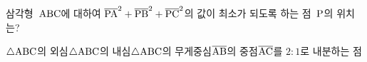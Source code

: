 삼각형~$\mathrm{ABC}$에 대하여 $\overline{\mathrm{PA}}^2+\overline{\mathrm{PB}}^2+\overline{\mathrm{PC}}^2$의 값이 최소가 되도록 하는 점~$\mathrm{P}$의 위치는?
\begin{choicesv}{$\triangle\mathrm{ABC}$의 외심}{$\triangle\mathrm{ABC}$의 내심}{$\triangle\mathrm{ABC}$의 무게중심}{$\overline{\mathrm{AB}}$의 중점}{$\overline{\mathrm{AC}}$를 $2:1$로 내분하는 점}\end{choicesv}
